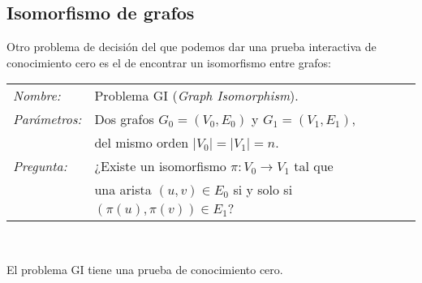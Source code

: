 


\subsection{Isomorfismo de grafos}


Otro problema de decisión del que podemos dar una prueba interactiva de conocimiento cero es el de encontrar un isomorfismo entre grafos:



\hfil

\begin{tabular}{|ll}
	\textit{Nombre:} & Problema GI (\textit{Graph Isomorphism}). \\
	\textit{Parámetros:} & Dos grafos $G_0 = (V_0, E_0)$ y $G_1 = (V_1, E_1)$, \\ & del mismo orden $\mid V_0 \mid = \mid V_1 \mid = n$. \\
	\textit{Pregunta:} & ¿Existe un isomorfismo $\pi : V_0 \rightarrow V_1$ tal que \\ & una arista $(u,v)\in E_0$ si y solo si $(\pi (u),\pi (v)) \in E_1$? \\
\end{tabular}
\\

\hfil

\begin{theorem}
	El problema GI tiene una prueba de conocimiento cero.
\end{theorem}


